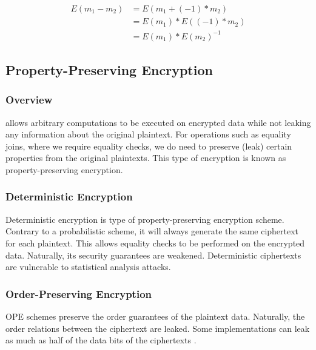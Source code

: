 \begin{definition}
\begin{equation}\label{ch2:sec:homomorphic-encryption:def-eq-additive-subtraciton}
    \begin{split}
        E(m_1 - m_2) &=  E(m_1 + (-1) * m_2) \\ 
        &=  E(m_1) * E((-1) * m_2) \\ 
        &=  E(m_1) * E(m_2)^{-1}
    \end{split}
\end{equation}

\end{definition}

\subsection{Property-Preserving Encryption}
\label{ch2:sec:property-preserving-encryption}

\subsubsection{Overview}

 allows arbitrary computations to be executed on encrypted data while not leaking any information about the original plaintext. For operations such as equality joins, where we require equality checks, we do need to preserve (leak) certain properties from the original plaintexts. This type of encryption is known as property-preserving encryption.

\subsubsection{Deterministic Encryption} 

Deterministic encryption is type of property-preserving encryption scheme. Contrary to a probabilistic scheme, it will always generate the same ciphertext for each plaintext. This allows equality checks to be performed on the encrypted data. Naturally, its security guarantees are weakened. Deterministic ciphertexts are vulnerable to statistical analysis attacks.

\subsubsection{Order-Preserving Encryption} 

\gls{OPE} schemes preserve the order guarantees of the plaintext data. Naturally, the order relations between the ciphertext are leaked. Some implementations can leak as much as half of the data bits of the ciphertexts \autocite{Popa2012-bw}.

